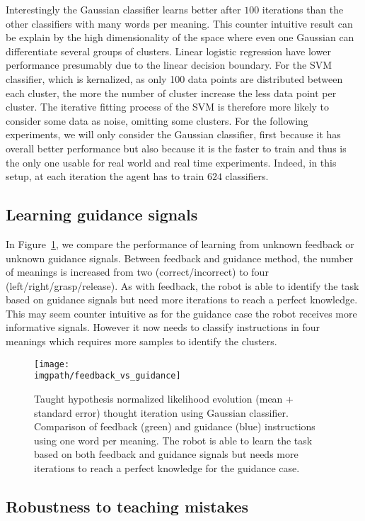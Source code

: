 Interestingly the Gaussian classifier learns better after $100$ iterations than the other classifiers with many words per meaning. This counter intuitive result can be explain by the high dimensionality of the space where even one Gaussian can differentiate several groups of clusters. Linear logistic regression have lower performance presumably due to the linear decision boundary. For the SVM classifier, which is kernalized, as only 100 data points are distributed between each cluster, the more the number of cluster increase the less data point per cluster. The iterative fitting process of the SVM is therefore more likely to consider some data as noise, omitting some clusters. For the following experiments, we will only consider the Gaussian classifier, first because it has overall better performance but also because it is the faster to train and thus is the only one usable for real world and real time experiments. Indeed, in this setup, at each iteration the agent has to train $624$ classifiers.

\subsection{Learning guidance signals}

In Figure~\ref{fig:Guidance}, we compare the performance of learning from unknown feedback or unknown guidance signals. Between feedback and guidance method, the number of meanings is increased from two (correct/incorrect) to four (left/right/grasp/release). As with feedback, the robot is able to identify the task based on guidance signals but need more iterations to reach a perfect knowledge. This may seem counter intuitive as for the guidance case the robot receives more informative signals. However it now needs to classify instructions in four meanings which requires more samples to identify the clusters. 

\begin{figure}[!ht]
  \centering
  \texttt{[image: \\imgpath/feedback\_vs\_guidance]}
  \caption{Taught hypothesis normalized likelihood evolution (mean + standard error) thought iteration using Gaussian classifier. Comparison of feedback (green) and guidance (blue) instructions using one word per meaning. The robot is able to learn the task based on both feedback and guidance signals but needs more iterations to reach a perfect knowledge for the guidance case.}
  \label{fig:Guidance}
\end{figure}

\subsection{Robustness to teaching mistakes}

